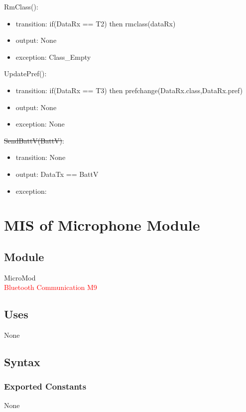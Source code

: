 \documentclass[12pt, titlepage]{article}
\begin{document}
\noindent RmClass():
\begin{itemize}
\item transition: if(DataRx == T2) then rmclass(dataRx)  
\item output: None 
\item exception: Class\_Empty 
\end{itemize}

\noindent UpdatePref():
\begin{itemize}
\item transition: if(DataRx == T3) then prefchange(DataRx.class,DataRx.pref)
\item output: None
\item exception: None 
\end{itemize}

\sout{\noindent SendBattV(BattV)}:
\begin{itemize}
\item transition: None 
\item output: DataTx == BattV 
\item exception:  
\end{itemize}

\newpage

\section{MIS of Microphone Module} \label{Microphone Module} 

\subsection{Module}

MicroMod\\
\textcolor{red}{Bluetooth Communication M9}

\subsection{Uses}

None

\subsection{Syntax}

\subsubsection{Exported Constants}

None 
\end{document}
